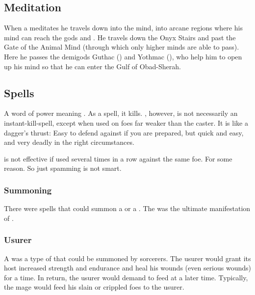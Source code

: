 \subsection{Meditation}
When a \rethyax meditates he travels down into the mind, into arcane regions where his mind can reach the gods and \daemons.
He travels down the Onyx Stairs and past the Gate of the Animal Mind (through which only higher minds are able to pass). 
Here he passes the demigods Guthac (\Venus) and Yothmac (\Mars), who help him to open up his mind so that he can enter the Gulf of Obad-Sherah.









\subsection{Spells}
\begin{gloss}
  A  word of power meaning . 
  As a spell, it kills. 
  , however, is not necessarily an instant-kill-spell, except when used on foes far weaker than the caster. 
  It is like a dagger's thrust: 
  Easy to defend against if you are prepared, but quick and easy, and very deadly in the right circumstances. 
  
   is not effective if used several times in a row against the same foe. 
  For some reason. 
  So just spamming  is not smart. 
\end{gloss}





\subsubsection{Summoning}
There were spells that could summon a \malgryph or a \firesalamander. 
The \firesalamander was the ultimate manifestation of . 





\subsubsection{Usurer}
A  was a type of \daemon that could be summoned by sorcerers.
The usurer would grant its host increased strength and endurance and heal his wounds (even serious wounds) for a time.
In return, the usurer would demand to feed at a later time. 
Typically, the mage would feed his slain or crippled foes to the usurer. 

